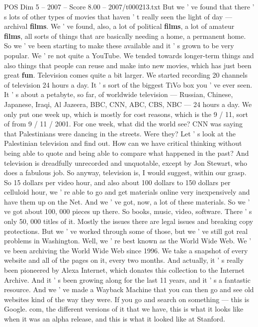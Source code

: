 \begin{textsample}{POS Dim 5 – 2007 – Score 8.00 – 2007/t000213.txt}
But we ' ve found that there ' s lots of other types of movies that haven ' t really seen the light of day — archival \textbf{films}.
We ' ve found, also, a lot of political \textbf{films}, a lot of amateur \textbf{films}, all sorts of things that are basically needing a home, a permanent home.
So we ' ve been starting to make these available and it ' s grown to be very popular.
We ' re not quite a YouTube.
We tended towards longer-term things and also things that people can reuse and make into new movies, which has just been great \textbf{fun}.
Television comes quite a bit larger.
We started recording 20 channels of television 24 hours a day.
It ' s sort of the biggest TiVo box you ' ve ever seen.
It ' s about a petabyte, so far, of worldwide television — Russian, Chinese, Japanese, Iraqi, Al Jazeera, BBC, CNN, ABC, CBS, NBC — 24 hours a day.
We only put one week up, which is mostly for cost reasons, which is the 9 / 11, sort of from 9 / 11 / 2001.
For one week, what did the world see?
CNN was saying that Palestinians were dancing in the streets.
Were they?
Let ' s look at the Palestinian television and find out.
How can we have critical thinking without being able to quote and being able to compare what happened in the past?
And television is dreadfully unrecorded and unquotable, except by Jon Stewart, who does a fabulous job.
So anyway, television is, I would suggest, within our grasp.
So 15 dollars per video hour, and also about 100 dollars to 150 dollars per celluloid hour, we ' re able to go and get materials online very inexpensively and have them up on the Net.
And we ' ve got, now, a lot of these materials.
So we ' ve got about 100, 000 pieces up there.
So books, music, video, software.
There ' s only 50, 000 titles of it.
Mostly the issues there are legal issues and breaking copy protections.
But we ' ve worked through some of those, but we ' ve still got real problems in Washington.
Well, we ' re best known as the World Wide Web.
We ' ve been archiving the World Wide Web since 1996.
We take a snapshot of every website and all of the pages on it, every two months.
And actually, it ' s really been pioneered by Alexa Internet, which donates this collection to the Internet Archive.
And it ' s been growing along for the last 11 years, and it ' s a fantastic resource.
And we ' ve made a Wayback Machine that you can then go and see old websites kind of the way they were.
If you go and search on something — this is Google. com, the different versions of it that we have, this is what it looks like when it was an alpha release, and this is what it looked like at Stanford.

\end{textsample}
